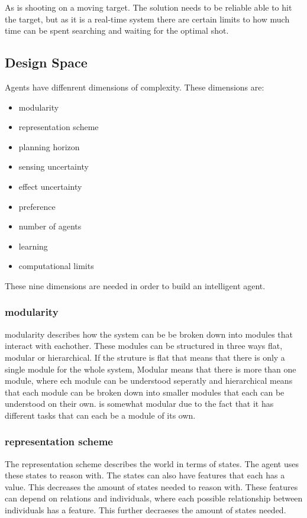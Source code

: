 As \name is shooting on a moving target. The solution needs to be reliable able
to hit the target, but as it is a real-time system there are certain limits to
how much time can be spent searching and waiting for the optimal shot.

\subsection{Design Space}



Agents have diffenrent dimensions of complexity. These dimensions are:

\begin{itemize}
  \item  modularity
  \item representation scheme
  \item planning horizon 
  \item sensing uncertainty
  \item effect uncertainty
  \item preference
  \item number of agents
  \item learning
  \item computational limits
\end{itemize}

These nine dimensions are needed in order to build an intelligent agent.

\subsubsection{modularity}
modularity describes how the system can be be broken down into modules that
interact with eachother. These modules can be structured in three ways flat,
modular or hierarchical. If the struture is flat that means that there is only a
single module for the whole system, Modular means that there is more than one
module, where ech module can be understood seperatly and hierarchical means that
each module can be broken down into smaller modules that each can be understood
on their own. \name is somewhat modular due to the fact that it has different
tasks that can each be a module of its own. 

\subsubsection{representation scheme}
The representation scheme describes the world in terms of states. The agent uses
these states to reason with. The states can also have features that each has a
value. This decreases the amount of states needed to reason with. These features
can depend on relations and individuals, where each possible relationship
between individuals has a feature. This further decraeses the amount of states
needed.






